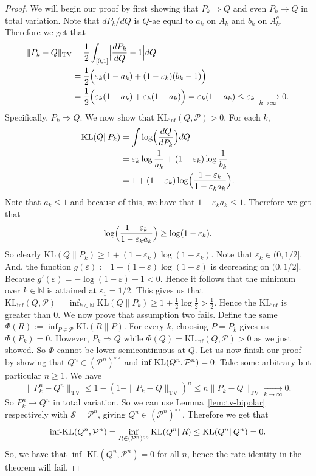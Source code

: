 \documentclass[11pt]{article}
\newcommand{\KL}{\mathrm{KL}}
\newcommand{\KLinf}{\mathrm{KL}_{\mathrm{inf}}}
\newcommand{\infKL}{\textnormal{inf-KL}}
\newcommand{\Pcal}{\mathcal{P}}
\theoremstyle{definition}
\theoremstyle{definition}
\begin{document}
\begin{proof}
We will begin our proof by first showing that $P_k\Rightarrow Q$ and even $P_k\to Q$ in total variation. Note that $dP_k/dQ$ is $Q$-ae equal to $a_k$ on $A_k$ and $b_k$ on $A_k^c$. Therefore we get that
\begin{align*}
\|P_k-Q\|_{\mathrm{TV}}&=\frac12\int_{[0,1]}\Bigl|\frac{dP_k}{dQ}-1\Bigr|dQ\\
&=\frac12\Bigl(\varepsilon_k(1-a_k)+(1-\varepsilon_k)(b_k-1)\Bigr)\\
&=\frac12\Bigl(\varepsilon_k(1-a_k)+\varepsilon_k(1-a_k)\Bigr) =\varepsilon_k(1-a_k)\le\varepsilon_k\xrightarrow[k\to\infty]{}0.
\end{align*}
Specifically, $P_k\Rightarrow Q$. We now show that $\KLinf(Q,\Pcal)>0$. For each $k$,
\begin{align*}
\KL(Q\|P_k)&=\int\log\Bigl(\frac{dQ}{dP_k}\Bigr)dQ\\
&=\varepsilon_k\log\frac{1}{a_k}+(1-\varepsilon_k)\log\frac{1}{b_k}\\
&=1+(1-\varepsilon_k)\log\Bigl(\frac{1-\varepsilon_k}{1-\varepsilon_k a_k}\Bigr).
\end{align*}
Note that $a_k\le 1$ and because of this, we have that $1-\varepsilon_k a_k\le 1$. Therefore we get that
\[
\log\Bigl(\frac{1-\varepsilon_k}{1-\varepsilon_k a_k}\Bigr)\ge\log(1-\varepsilon_k).
\]
So clearly $\KL(Q\|P_k)\ge 1+(1-\varepsilon_k)\log(1-\varepsilon_k)$. Note that $\varepsilon_k\in(0,1/2]$. And, the function $g(\varepsilon):=1+(1-\varepsilon)\log(1-\varepsilon)$ is decreasing on $(0,1/2]$. Because $g'(\varepsilon)=-\log(1-\varepsilon)-1<0$. Hence it follows that the minimum over $k\in\mathbb N$ is attained at $\varepsilon_1=1/2$. This gives us that $\KLinf(Q,\Pcal)=\inf_{k\in\mathbb N}\KL(Q\|P_k)\ge 1+\frac12\log\frac12 >\frac12$. Hence the $\KLinf$ is greater than $0$. We now prove that assumption two fails. Define the same $\Phi(R):=\inf_{P\in\Pcal}\KL(R\|P)$. For every $k$, choosing $P=P_k$ gives us $\Phi(P_k)=0$. However, $P_k\Rightarrow Q$ while $\Phi(Q)=\KLinf(Q,\Pcal)>0$ as we just showed. So $\Phi$ cannot be lower semicontinuous at $Q$. Let us now finish our proof by showing that $Q^n\in(\Pcal^n)^{\circ\circ}$ and $\infKL(Q^n, \Pcal^n)=0$. Take some arbitrary but particular $n\ge 1$. We have
\[
\|P_k^n-Q^n\|_{\mathrm{TV}}\le 1-(1-\|P_k-Q\|_{\mathrm{TV}})^n \le n\|P_k-Q\|_{\mathrm{TV}} \xrightarrow[k\to\infty]{}0.
\]
So $P_k^n\to Q^n$ in total variation. So we can use Lemma~\ref{lem:tv-bipolar} respectively with $\mathcal S=\Pcal^n$, giving $Q^n\in(\Pcal^n)^{\circ\circ}$. Therefore we get that
\[
\infKL(Q^n,\Pcal^n) =\inf_{R\in(\Pcal^n)^{\circ\circ}}\KL(Q^n\|R) \le \KL(Q^n\|Q^n)=0.
\]
So, we have that $\inf\text{-}\KL(Q^n,\Pcal^n)=0$ for all $n$, hence the rate identity in the theorem will fail.
\end{proof}
\end{document}
